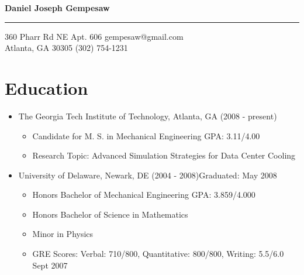 \documentclass[10pt]{article}
\newenvironment{myitem}{
\begin{itemize}
  \setlength{\itemsep}{1pt}
  \setlength{\parskip}{0pt}
  \setlength{\parsep}{0pt}
}{\end{itemize}}
\begin{document}
\begin{center} 
\Large 
\textbf{Daniel Joseph Gempesaw} 
\end{center} 
\hrule 
\vspace{0.2 cm}
\normalsize
360 Pharr Rd NE Apt. 606 \hfill gempesaw@gmail.com\\
Atlanta, GA 30305 \hfill (302) 754-1231\\
\vspace{-.60 cm}

\section{Education}
\vspace{-0.25cm}
  \begin{myitem}
\item The Georgia Tech Institute of Technology, Atlanta, GA \hfill (2008 - present)
\begin{myitem}
\item Candidate for M. S. in Mechanical Engineering \hfill GPA: 3.11/4.00
\item Research Topic: Advanced Simulation Strategies for Data Center Cooling
\end{myitem}
\item University of Delaware, Newark, DE (2004 - 2008)\hfill Graduated: May 2008
\begin{myitem}
\item Honors Bachelor of Mechanical Engineering \hfill GPA: 3.859/4.000\item Honors Bachelor of Science in Mathematics
\item Minor in Physics
\item GRE Scores: Verbal: 710/800, Quantitative: 800/800, Writing: 5.5/6.0 \hfill Sept 2007
\end{myitem}
\end{myitem}

\vspace{-0.45 cm}
\end{document}
